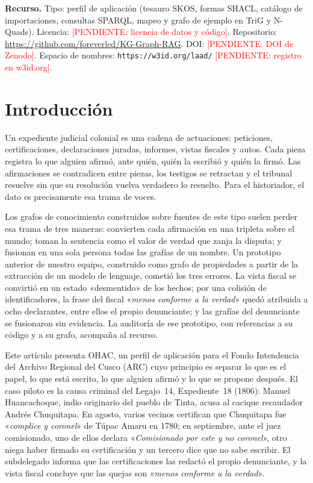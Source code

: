 \documentclass[runningheads]{llncs}
\newcommand{\pendiente}[1]{\textcolor{red}{[PENDIENTE: #1]}}
\newcommand{\ttt}[1]{\texttt{\small #1}}
\newcommand{\cita}[1]{«\textit{#1}»}
\begin{document}
\noindent\textbf{Recurso.}
Tipo: perfil de aplicación (tesauro SKOS, formas SHACL, catálogo de importaciones, consultas SPARQL, mapeo y grafo de
ejemplo en TriG y N-Quads).
Licencia: \pendiente{licencia de datos y código}.
Repositorio: \url{https://github.com/foreverlcd/KG-Graph-RAG}.
DOI: \pendiente{DOI de Zenodo}.
Espacio de nombres: \ttt{https://w3id.org/laad/} \pendiente{registro en w3id.org}.

\section{Introducción}\label{sec:intro}

Un expediente judicial colonial es una cadena de actuaciones: peticiones, certificaciones, declaraciones juradas,
informes, vistas fiscales y autos. Cada pieza registra lo que alguien afirmó, ante quién, quién la escribió y quién
la firmó. Las afirmaciones se contradicen entre piezas, los testigos se retractan y el tribunal resuelve sin que su
resolución vuelva verdadero lo resuelto. Para el historiador, el dato es precisamente esa trama de voces.

Los grafos de conocimiento construidos sobre fuentes de este tipo suelen perder esa trama de tres maneras: convierten
cada afirmación en una tripleta sobre el mundo; toman la sentencia como el valor de verdad que zanja la disputa; y
fusionan en una sola persona todas las grafías de un nombre. Un prototipo anterior de nuestro equipo, construido como
grafo de propiedades a partir de la extracción de un modelo de lenguaje, cometió los tres errores. La vista fiscal se
convirtió en un estado «desmentido» de los hechos; por una colisión de identificadores, la frase del fiscal
\cita{menos conforme a la verdad} quedó atribuida a ocho declarantes, entre ellos el propio denunciante; y las grafías
del denunciante se fusionaron sin evidencia. La auditoría de ese prototipo, con referencias a su código y a su grafo,
acompaña al recurso.

Este artículo presenta OHAC, un perfil de aplicación para el Fondo Intendencia del Archivo Regional del Cusco (ARC)
cuyo principio es separar lo que es el papel, lo que está escrito, lo que alguien afirmó y lo que se propone después.
El caso piloto es la causa criminal del Legajo~14, Expediente~18 (1806): Manuel Huancachoque, indio originario del
pueblo de Tinta, acusa al cacique recaudador Andrés Chuquitapa. En agosto, varios vecinos certifican que Chuquitapa
fue \cita{complice y coronel} de Túpac Amaru en 1780; en septiembre, ante el juez comisionado, uno de ellos declara
\cita{Comisionado por este y no coronel}, otro niega haber firmado su certificación y un tercero dice que no sabe
escribir. El subdelegado informa que las certificaciones las redactó el propio denunciante, y la vista fiscal concluye
que las quejas son \cita{menos conforme a la verdad}.
\end{document}
